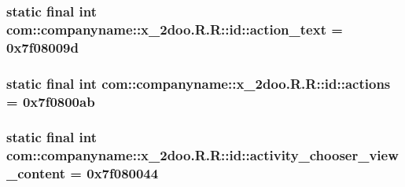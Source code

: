 \hypertarget{classcom_1_1companyname_1_1x__2doo_1_1_r_1_1id_93b0e0d6afad2b168d24073b7287691e}{
\subsubsection[{action\_\-text}]{\setlength{\rightskip}{0pt plus 5cm}static final int com::companyname::x\_\-2doo.R.R::id::action\_\-text = 0x7f08009d}}
\label{classcom_1_1companyname_1_1x__2doo_1_1_r_1_1id_93b0e0d6afad2b168d24073b7287691e}


\hypertarget{classcom_1_1companyname_1_1x__2doo_1_1_r_1_1id_b8521a7487e8898f978991bbf7b2c460}{
\subsubsection[{actions}]{\setlength{\rightskip}{0pt plus 5cm}static final int com::companyname::x\_\-2doo.R.R::id::actions = 0x7f0800ab}}
\label{classcom_1_1companyname_1_1x__2doo_1_1_r_1_1id_b8521a7487e8898f978991bbf7b2c460}


\hypertarget{classcom_1_1companyname_1_1x__2doo_1_1_r_1_1id_59de20a3a2e5e4b34da1113cf7c24b7b}{
\subsubsection[{activity\_\-chooser\_\-view\_\-content}]{\setlength{\rightskip}{0pt plus 5cm}static final int com::companyname::x\_\-2doo.R.R::id::activity\_\-chooser\_\-view\_\-content = 0x7f080044}}
\label{classcom_1_1companyname_1_1x__2doo_1_1_r_1_1id_59de20a3a2e5e4b34da1113cf7c24b7b}


